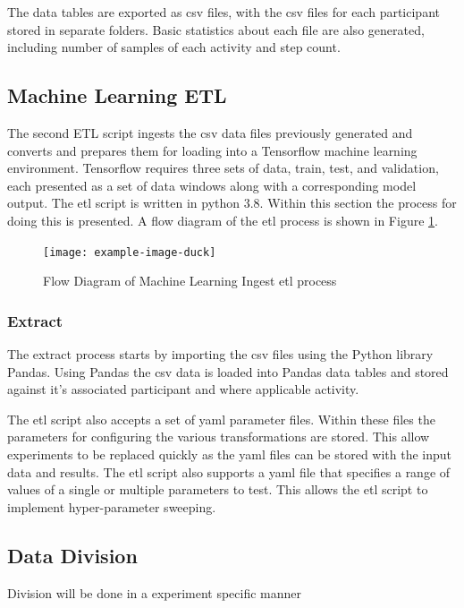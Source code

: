 The data tables are exported as \acrfull{csv} files, with the \acrshort{csv} files for each participant stored in separate folders. Basic statistics about each file are also generated, including number of samples of each activity and step count.

\subsection{Machine Learning ETL}
\label{subsec:ML-ETL}
The second ETL script ingests the \acrshort{csv} data files previously generated and converts and prepares them for loading into a Tensorflow machine learning environment. Tensorflow requires three sets of data, train, test, and validation, each presented as a set of data windows along with a corresponding model output. The \acrshort{etl} script is written in python 3.8. Within this section the process for doing this is presented. A flow diagram of the \acrshort{etl} process is shown in Figure \ref{fig:methods_ml_ETL}.

\begin{figure}[!hbt]
    \centering
    \texttt{[image: example-image-duck]}
    \caption{Flow Diagram of Machine Learning Ingest \acrshort{etl} process}
    \label{fig:methods_ml_ETL}
\end{figure}

\subsubsection{Extract}
The extract process starts by importing the \acrshort{csv} files using the Python library Pandas. Using Pandas the \acrshort{csv} data is loaded into Pandas data tables and stored against it's associated participant and where applicable activity.

The \acrshort{etl} script also accepts a set of \acrshort{yaml} parameter files. Within these files the parameters for configuring the various transformations are stored. This allow experiments to be replaced quickly as the \acrshort{yaml} files can be stored with the input data and results. The \acrshort{etl} script also supports a \acrshort{yaml} file that specifies a range of values of a single or multiple parameters to test. This allows the \acrshort{etl} script to implement hyper-parameter sweeping.

\subsection{Data Division}
Division will be done in a experiment specific manner
 
